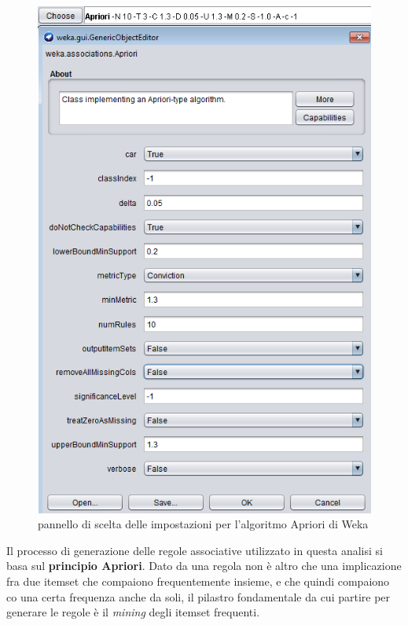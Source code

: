     \begin{figure}
        \centering
        \caption{pannello di scelta delle impostazioni per l'algoritmo Apriori di Weka}
        \label{apriori_weka}
	    \includegraphics[scale=0.7]{img/apriori_weka.png}
    \end{figure}

        Il processo di generazione delle regole associative utilizzato in questa analisi si basa sul \textbf{principio Apriori}. Dato da una regola non è altro che una implicazione fra due itemset che compaiono frequentemente insieme, e che quindi compaiono co una certa frequenza anche da soli, il pilastro fondamentale da cui partire per generare le regole è il \textit{mining} degli itemset frequenti. \\
        
